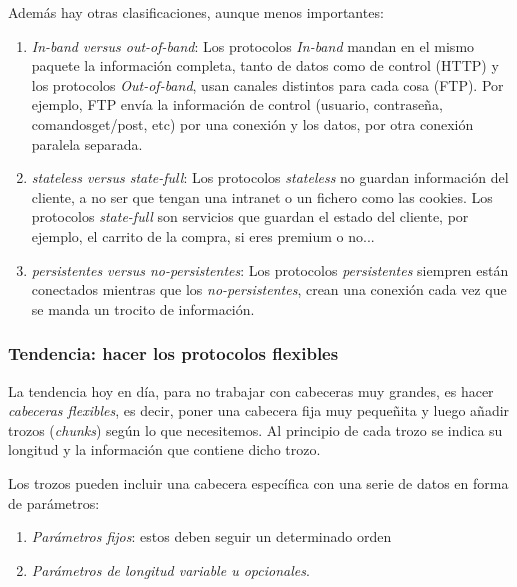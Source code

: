 \documentclass[10pt,a4paper,spanish]{report}
\begin{document}
Además hay otras clasificaciones, aunque menos importantes:
\begin{enumerate}[\color{tema2}{$\diamondsuit$}]
  \item \textit{\textcolor{tema2}{In-band versus out-of-band}}: Los protocolos \textit{\textcolor{tema2}{In-band}} mandan en el mismo paquete la información completa, tanto de datos como de control (HTTP) y los protocolos \textit{\textcolor{tema2}{Out-of-band}}, usan canales distintos para cada cosa (FTP). Por ejemplo, FTP envía la información de control (usuario, contraseña, comandosget/post, etc) por una conexión y los datos, por otra conexión paralela separada.
  \item \textit{\textcolor{tema2}{stateless versus state-full}}: Los protocolos \textit{\textcolor{tema2}{stateless}} no guardan información del cliente, a no ser que tengan una intranet o un fichero como las cookies. Los protocolos \textit{\textcolor{tema2}{state-full}} son servicios que guardan el estado del cliente, por ejemplo, el carrito de la compra, si eres premium o no...
  \item \textit{\textcolor{tema2}{persistentes versus no-persistentes}}: Los protocolos \textit{\textcolor{tema2}{persistentes}} siempren están conectados mientras que los \textit{\textcolor{tema2}{no-persistentes}}, crean una conexión cada vez que se manda un trocito de información.
\end{enumerate}

\subsubsection{\textcolor{tema2}Tendencia: hacer los protocolos flexibles}
La tendencia hoy en día, para no trabajar con cabeceras muy grandes, es hacer \textit{\textcolor{tema2}{cabeceras flexibles}}, es decir, poner una cabecera fija muy pequeñita y luego añadir trozos (\textit{\textcolor{tema2}{chunks}}) según lo que necesitemos. Al principio de cada trozo se indica su longitud y la información que contiene dicho trozo.

Los trozos pueden incluir una cabecera específica con una serie de datos en forma de parámetros:
\begin{enumerate}[\color{tema2}{$\bullet$}]
  \item \textcolor{tema2}{\textit{Parámetros fijos}}: estos deben seguir un determinado orden
  \item \textcolor{tema2}{\textit{Parámetros de longitud variable u opcionales}}.
\end{enumerate}
\end{document}
